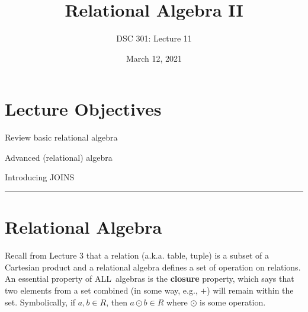 \documentclass{article}
\newtheorem{definition}{Definition}
\begin{document}
\title{Relational Algebra II}
\author{DSC 301: Lecture 11}
\date{March 12, 2021} %
\maketitle





\begin{outline}[enumerate]

\end{outline}
\begin{outline}
       
\end{outline}




\section*{Lecture Objectives}
\begin{outline}
  \1 Review basic relational algebra      
       
   \1 Advanced (relational) algebra
   
   \1 Introducing JOINS    
       
        

\end{outline}

\hspace{-0.5cm}\rule[-0.101in]{\textwidth}{0.0025in}
% 
% 









\section*{Relational Algebra }
Recall from Lecture 3 that a relation (a.k.a. table, tuple) is a subset of a Cartesian product and a relational algebra defines a set of operation on relations.  An essential property of ALL\ algebras is the \textbf{closure} property, which says that two elements from a set combined (in some way, e.g., $+$) will remain within the set.  Symbolically, if $a,b \in R$, then $a \odot b \in R$ where $\odot$ is some operation.  
  
\end{document}
